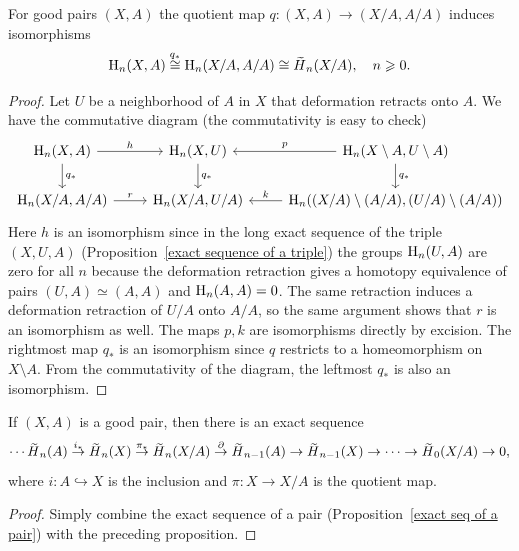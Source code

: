 \begin{prop}
    For good pairs $(X,A)$ the quotient map $q:(X,A)\to (X/A,A/A)$ induces isomorphisms \[\rmH_n(X,A)\overset{q_\ast}\cong \rmH_n(X/A,A/A)\cong \wt{H}_n(X/A),\quad n\geq 0.\]
\end{prop}
\begin{proof}
     Let $U$ be a neighborhood of $A$ in $X$ that deformation retracts onto $A$. We have the commutative diagram (the commutativity is easy to check)
      \[\begin{tikzcd}
        \rmH_n(X,A) \arrow[r,"h"]\arrow[d,"q_\ast"] & \rmH_n(X,U)\arrow[d,"q_\ast"]\ar[r,leftarrow,"p"] & \rmH_n(X\setminus A,U\setminus A)\arrow[d,"q_\ast"] \\
        \rmH_n(X/ A,A/A)\arrow[r,"r"] &\rmH_n(X/A,U/A) \ar[r,leftarrow,"k"] &\rmH_n((X/A)\setminus (A/A),(U/A)\setminus(A/A))
    \end{tikzcd}\]
    Here $h$ is an isomorphism since in the long exact sequence of the triple $(X,U,A)$ (Proposition~\ref{exact sequence of a triple}) the groups $\mathrm{H}_n(U,A)$ are zero for all $n$ because the deformation retraction gives a homotopy equivalence of pairs $(U,A)\simeq (A,A)$ and $\mathrm{H}_n(A,A)=0$. The same retraction induces a deformation retraction of $U/A$ onto $A/A$, so the same argument shows that $r$ is an isomorphism as well. The maps $p,k$ are isomorphisms directly by excision. The rightmost map $q_\ast$ is an isomorphism since $q$ restricts to a homeomorphism on $X\setminus A$. From the commutativity of the diagram, the leftmost $q_\ast$ is also an isomorphism.
\end{proof}

\begin{thm}
    If $(X,A)$ is a good pair, then there is an exact sequence
    \[\cdots \wt{H}_n(A)\overset{i_\ast}\to \wt{H}_n(X)\overset{\pi_\ast}\to \wt{H}_n(X/A)\overset\partial\to \wt{H}_{n-1}(A)\to \wt{H}_{n-1}(X)\to \cdots \to \wt{H}_0(X/A)\to 0,\]
    where $i:A\hookrightarrow X$ is the inclusion and $\pi:X\to X/A$ is the quotient map.
\end{thm}
\begin{proof}
     Simply combine the exact sequence of a pair (Proposition~\ref{exact seq of a pair}) with the preceding proposition.
\end{proof}


